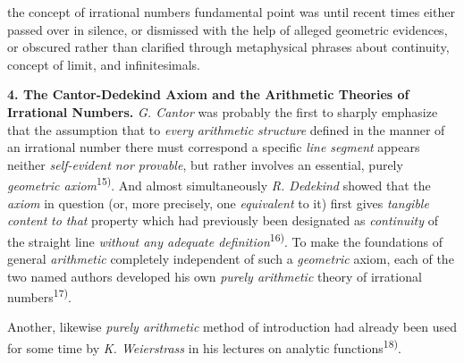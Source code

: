 \thispagestyle{fancy}

\vspace{0.5cm}

the concept of irrational numbers fundamental point was until recent times either passed over in silence, or dismissed with the help of alleged geometric evidences, or obscured rather than clarified through metaphysical phrases about continuity, concept of limit, and infinitesimals.

\vspace{0.5cm}

\textbf{4. The Cantor-Dedekind Axiom and the Arithmetic Theories of Irrational Numbers.} \textit{G. Cantor} was probably the first to sharply emphasize that the assumption that to \textit{every} \textit{arithmetic structure} defined in the manner of an irrational number there must correspond a specific \textit{line segment} appears neither \textit{self-evident nor provable}, but rather involves an essential, purely \textit{geometric axiom}\textsuperscript{15)}. And almost simultaneously \textit{R. Dedekind} showed that the \textit{axiom} in question (or, more precisely, one \textit{equivalent} to it) first gives \textit{tangible content} \textit{to that} property which had previously been designated as \textit{continuity} of the straight line \textit{without any adequate definition}\textsuperscript{16)}. To make the foundations of general \textit{arithmetic} completely independent of such a \textit{geometric} axiom, each of the two named authors developed his own \textit{purely arithmetic} theory of irrational numbers\textsuperscript{17)}.

Another, likewise \textit{purely arithmetic} method of introduction had already been used for some time by \textit{K. Weierstrass} in his lectures on analytic functions\textsuperscript{18)}. 

